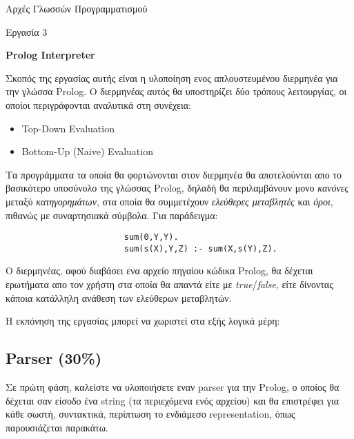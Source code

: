 \documentclass[10pt]{article}
\begin{document}
\begin{center}
    \huge{Αρχές Γλωσσών Προγραμματισμού}

    \LARGE{Εργασία 3}

    \textbf{\Large{Prolog Interpreter}}
\end{center}

\vspace{0.5cm}

Σκοπός της εργασίας αυτής είναι η υλοποίηση ενος απλουστευμένου διερμηνέα για την γλώσσα Prolog. Ο διερμηνέας αυτός θα υποστηρίζει δύο τρόπους λειτουργίας, οι οποίοι περιγράφονται αναλυτικά στη συνέχεια:


\begin{itemize}
    \item Top-Down Evaluation
    \item Bottom-Up (Naive) Evaluation
\end{itemize}


Τα προγράμματα τα οποία θα φορτώνονται στον διερμηνέα θα αποτελούνται απο το βασικότερο υποσύνολο της γλώσσας Prolog, δηλαδή θα περιλαμβάνουν μονο \textit{κανόνες} μεταξύ \textit{κατηγορημάτων}, στα οποία θα συμμετέχουν \textit{ελεύθερες μεταβλητές} και \textit{όροι}, πιθανώς με συναρτησιακά σύμβολα. Για παράδειγμα: 



\begin{verbatim}
                        sum(0,Y,Y).
                        sum(s(X),Y,Z) :- sum(X,s(Y),Z).
\end{verbatim}



Ο διερμηνέας, αφού διαβάσει ενα αρχείο πηγαίου κώδικα Prolog, θα δέχεται ερωτήματα απο τον χρήστη στα οποία θα απαντά είτε με \textit{true}/\textit{false}, είτε δίνοντας κάποια κατάλληλη ανάθεση των ελεύθερων μεταβλητών.\

Η εκπόνηση της εργασίας μπορεί να χωριστεί στα εξής λογικά μέρη:

\subsection*{Parser (30\%)}

Σε πρώτη φάση, καλείστε να υλοποιήσετε εναν parser για την Prolog, ο οποίος θα δέχεται σαν είσοδο ένα string (τα περιεχόμενα ενός αρχείου) και θα επιστρέφει για κάθε σωστή, συντακτικά, περίπτωση το ενδιάμεσο representation, όπως παρουσιάζεται παρακάτω.\
\end{document}
